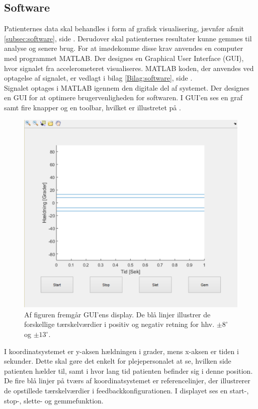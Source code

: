 \subsection{Software}\label{software_test_implem}
Patienternes data skal behandles i form af grafisk visualisering, jævnfør afsnit \ref{subsec:software}, side \pageref{subsec:software}. Derudover skal patienternes resultater kunne gemmes til analyse og senere brug. For at imødekomme disse krav anvendes en computer med programmet MATLAB. Der designes en Graphical User Interface (GUI), hvor signalet fra accelerometeret visualiseres. MATLAB koden, der anvendes ved optagelse af signalet, er vedlagt i bilag \ref{Bilag:software}, side \pageref{Bilag:software}.\\ 
Signalet optages i MATLAB igennem den digitale del af systemet. Der designes en GUI for at optimere brugervenligheden for softwaren. I GUI'en ses en graf samt fire knapper og en toolbar, hvilket er illustretet på . 
\begin{figure}[H] 
	\centering 
	\includegraphics[scale=0.5]{figures/cProblemloesning/GUI_generisk.PNG}
	\caption{Af figuren fremgår GUI'ens display. De blå linjer illustrer de forskellige tærskelværdier i positiv og negativ retning for hhv. $\pm 8^{\circ}$ og $\pm 13^{\circ}$.}
	\label{Fig:GUI_generisk}
\end{figure} 
\noindent I koordinatsystemet er y-aksen hældningen i grader, mens x-aksen er tiden i sekunder. Dette skal gøre det enkelt for plejepersonalet at se, hvilken side patienten hælder til, samt i hvor lang tid patienten befinder sig i denne position. De fire blå linjer på tværs af koordinatsystemet er referencelinjer, der illustrerer de opstillede tærskelværdier i feedbackkonfigurationen. I displayet ses en start-, stop-, slette- og gemmefunktion.
